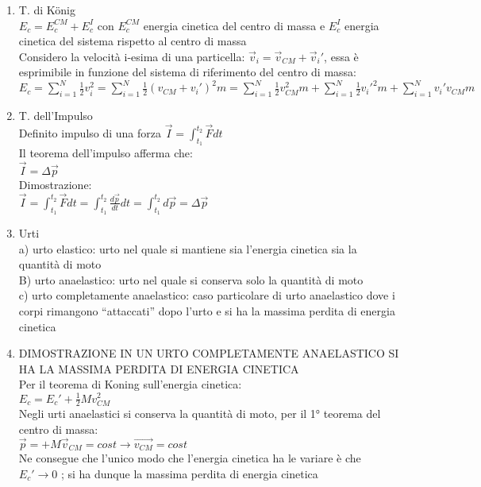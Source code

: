 \documentclass[8pt]{scrreprt}
\begin{document}
\begin{multicols*}{2}
\begin{enumerate}
\item T. di König\\
$E_c = E_c^{CM} + E_c^I$ con $E_c^{CM}$ energia cinetica del centro di massa e $E_c^I$ energia cinetica del sistema rispetto al centro di massa\\
Considero la velocità i-esima di una particella: $\vec{v}_i = \vec{v}_{CM} + \vec{v}_i'$, essa è esprimibile in funzione del sistema di riferimento del centro di massa:\\
$E_c = \sum_{i=1}^{N} \frac{1}{2} v_i^2 = \sum_{i=1}^{N} \frac{1}{2} (v_{CM} + v_i')^2 m = \sum_{i=1}^{N} \frac{1}{2} v_{CM}^2 m+ \sum_{i=1}^{N} \frac{1}{2} v_i'^2 m+ \sum_{i=1}^{N} v_i' v_{CM} m$

\item T. dell'Impulso\\
Definito impulso di una forza $\vec{I} = \int_{t_1}^{t_2} \vec{F} dt$\\
Il teorema dell'impulso afferma che:\\
$\vec{I} = \Delta \vec{p}$\\
Dimostrazione:\\
$\vec{I} = \int_{t_1}^{t_2} \vec{F} dt = \int_{t_1}^{t_2} \frac{d\vec{p}}{dt} dt = \int_{t_1}^{t_2} d\vec{p} = \Delta \vec{p}$

\item Urti\\
a) urto elastico: urto nel quale si mantiene sia l’energia cinetica sia la quantità di moto\\
B) urto anaelastico: urto nel quale si conserva solo la quantità di moto \\
c) urto completamente anaelastico: caso particolare di urto anaelastico dove i corpi rimangono “attaccati” dopo l’urto e si ha la massima perdita di energia cinetica

\item DIMOSTRAZIONE IN UN URTO COMPLETAMENTE ANAELASTICO SI HA LA MASSIMA PERDITA DI ENERGIA CINETICA\\
Per il teorema di Koning sull’energia cinetica:\\$E_c = E_c' + \frac{1}{2} M v_{CM}^2$\\
Negli urti anaelastici si conserva la quantità di moto, per il 1° teorema del centro di massa:\\
$\vec{p} = + M \vec{v}_{CM} = cost \rightarrow \vec{v_{CM}} = cost$\\
Ne consegue che l’unico modo che l’energia cinetica ha le variare è che $E_c' \to 0$ ; si ha dunque la massima perdita di energia cinetica


\end{enumerate}
\end{multicols*}
\end{document}

